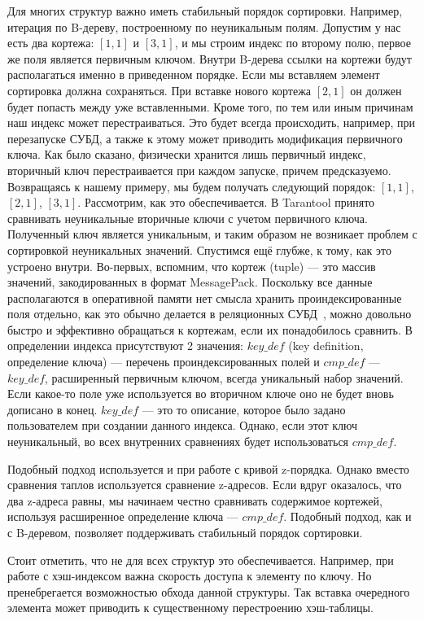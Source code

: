 Для многих структур важно иметь стабильный порядок сортировки.
Например, итерация по B-дереву, построенному по неуникальным полям.
Допустим у нас есть два кортежа: $[1, 1]$ и $[3, 1]$,
и мы строим индекс по второму полю,
первое же поля является первичным ключом.
Внутри B-дерева ссылки на кортежи будут располагаться именно в приведенном порядке.
Если мы вставляем элемент сортировка должна сохраняться.
При вставке нового кортежа $[2, 1]$ он должен будет попасть между уже вставленными.
Кроме того, по тем или иным причинам наш индекс может перестраиваться.
Это будет всегда происходить, например, при перезапуске СУБД,
а также к этому может приводить модификация первичного ключа.
Как было сказано, физически хранится лишь первичный индекс,
вторичный ключ перестраивается при каждом запуске,
причем предсказуемо.
Возвращаясь к нашему примеру, мы будем получать следующий порядок:
$[1, 1]$, $[2, 1]$, $[3, 1]$.
Рассмотрим, как это обеспечивается.
В Tarantool принято сравнивать неуникальные вторичные ключи с учетом первичного ключа.
Полученный ключ является уникальным, и таким образом не возникает проблем с сортировкой неуникальных значений.
Спустимся ещё глубже, к тому, как это устроено внутри.
Во-первых, вспомним, что кортеж (tuple) --- это массив значений, закодированных в формат MessagePack.
Поскольку все данные располагаются в оперативной памяти
нет смысла хранить проиндексированные поля отдельно,
как это обычно делается в реляционных СУБД~\cite{liu2001secondary, owens2010sqlite},
можно довольно быстро и эффективно обращаться к кортежам,
если их понадобилось сравнить.
В определении индекса присутствуют 2 значения: $key\_def$ (key definition, определение ключа) --- 
перечень проиндексированных полей и $cmp\_def$ --- $key\_def$, расширенный первичным ключом, всегда уникальный набор значений.
Если какое-то поле уже используется во вторичном ключе оно не будет вновь дописано в конец.
$key\_def$ --- это то описание, которое было задано пользователем при создании данного индекса.
Однако, если этот ключ неуникальный, во всех внутренних сравнениях будет использоваться $cmp\_def$.

Подобный подход используется и при работе с кривой z-порядка.
Однако вместо сравнения таплов используется сравнение z-адресов.
Если вдруг оказалось, что два z-адреса равны, мы начинаем честно сравнивать
содержимое кортежей, используя расширенное определение ключа --- $cmp\_def$.
Подобный подход, как и с B-деревом, позволяет поддерживать
стабильный порядок сортировки.

Стоит отметить, что не для всех структур это обеспечивается.
Например, при работе с хэш-индексом важна скорость доступа к элементу по ключу.
Но пренебрегается возможностью обхода данной структуры.
Так вставка очередного элемента может приводить к существенному
перестроению хэш-таблицы.

